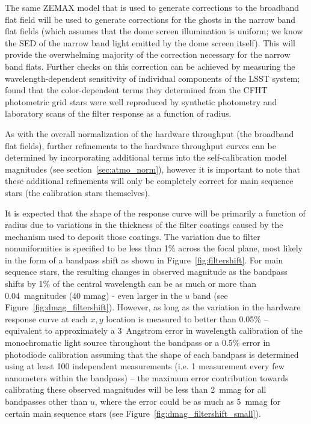 \documentclass[12pt,preprint]{aastex}
\begin{document}
The same ZEMAX model that is used to generate corrections to the
broadband flat field will be used to generate corrections for the
ghosts in the narrow band flat fields (which assumes that the dome
screen illumination is uniform; we know the SED of the narrow band
light emitted by the dome screen itself).  This will provide the
overwhelming majority of the correction necessary for the narrow band
flats.  Further checks on this correction can be achieved by measuring
the wavelength-dependent sensitivity of individual components of the
LSST system; \citet{Regnault2009} found that the color-dependent terms
they determined from the CFHT photometric grid stars were well
reproduced by synthetic photometry and laboratory scans of the filter
response as a function of radius.

As with the overall normalization of the hardware throughput (the
broadband flat fields), further refinements to the hardware throughput
curves can be determined by incorporating additional terms into the
self-calibration model magnitudes (see section~\ref{sec:atmo_norm}),
however it is important to note that these additional refinements will
only be completely correct for main sequence stars (the calibration
stars themselves).



It is expected that the shape
of the response curve will be primarily a function of radius due to
variations in the thickness of the filter coatings caused by the
mechanism used to deposit those coatings. The variation due to filter
nonuniformities is specified to be less than 1\% across the focal
plane, most likely in the form of a bandpass shift as shown in
Figure~\ref{fig:filtershift}. For main sequence stars, the resulting
changes in observed magnitude as the bandpass shifts by 1\% of the
central wavelength can be as much or more than 0.04~magnitudes (40
mmag) - even larger in the $u$ band (see
Figure~\ref{fig:dmag_filtershift}). However, as long as the variation
in the hardware response curve at each $x,y$ location is measured to better than 0.05\% --
equivalent to approximately a 3~Angstrom error in wavelength
calibration of the monochromatic light source throughout the bandpass
or a 0.5\% error in photodiode calibration assuming that the shape of
each bandpass is determined using at least 100 independent
measurements (i.e. 1 measurement every few nanometers within the bandpass) --
the maximum error contribution towards calibrating these observed magnitudes
will be less than 2~mmag for all bandpasses other than $u$, where the
error could be as much as 5~mmag for certain main sequence stars (see
Figure~\ref{fig:dmag_filtershift_small}). 
\end{document}
